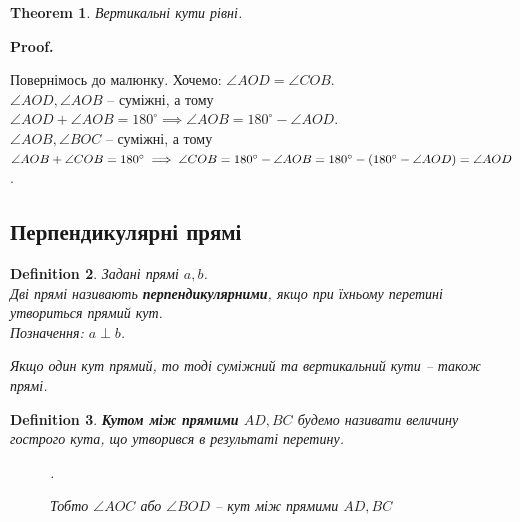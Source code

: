 \documentclass[a4paper, 10pt]{article}
\makeatletter
\def\qed{$\blacksquare$}
\theoremstyle{theoremdd}
\newtheorem{theorem}{Theorem}[subsection]
\theoremstyle{theoremdd}
\theoremstyle{theoremdd}
\newtheorem{definition}[theorem]{Definition}
\theoremstyle{theoremdd}
\theoremstyle{theoremdd}
\theoremstyle{theoremdd}
\theoremstyle{theoremdd}
\theoremstyle{theoremdd}
\theoremstyle{theoremdd}
\renewenvironment{proof}[1][Proof.\\]{\par
\pushQED{\hfill \qed}%
\normalfont \topsep6\p@\@plus6\p@\relax
\trivlist
\item\relax
{\bfseries
#1\@addpunct{.}}\hspace\labelsep\ignorespaces
}{%
\popQED\endtrivlist\@endpefalse
}
\makeatother
\begin{document}
\begin{theorem}
Вертикальні кути рівні.
\end{theorem}

\begin{proof}
Повернімось до малюнку. Хочемо: $\angle AOD = \angle COB$.\\
$\angle AOD, \angle AOB$ -- суміжні, а тому $\angle AOD + \angle AOB = 180^{\circ} \implies \angle AOB = 180^{\circ} - \angle AOD$.\\
$\angle AOB, \angle BOC$ -- суміжні, а тому $\angle AOB + \angle COB = 180^{\circ} \\ \implies \angle COB = 180^{\circ} - \angle AOB = 180^{\circ} - (180^{\circ} - \angle AOD) = \angle AOD$.
\end{proof}

\subsection{Перпендикулярні прямі}
\begin{definition}
Задані прямі $a,b$.\\
Дві прямі називають \textbf{перпендикулярними}, якщо при їхньому перетині утвориться прямий кут.\\
Позначення: $a \perp b$.
\begin{figure}[H]
\centering
{}
\end{figure}
Якщо один кут прямий, то тоді суміжний та вертикальний кути -- також прямі.
\end{definition}

\begin{definition}
\textbf{Кутом між прямими} $AD,BC$ будемо називати величину гострого кута, що утворився в результаті перетину.
\begin{figure}[H]
\centering
{}
\caption*{Тобто $\angle AOC$ або $\angle BOD$ -- кут між прямими $AD,BC$}.
\end{figure}
\end{definition}
\end{document}
